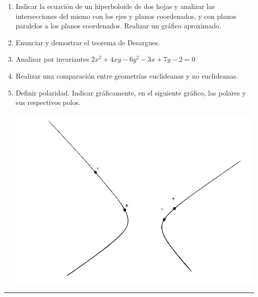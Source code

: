 \documentclass[9pt,a4paper]{extarticle}
\begin{document}
\begin{enumerate}

\item Indicar la ecuación de un hiperboloide de dos hojas y analizar las intersecciones del mismo con los ejes y planos coordenados, y con planos paralelos a los planos coordenados. Realizar un gráfico aproximado.

\item Enunciar y demostrar el teorema de Desargues.

\item Analizar por invariantes $2x^2 + 4xy - 6y^2-3x+7y-2=0$

\item Realizar una comparación entre geometrías euclideanas y no euclideanas.

\item Definir polaridad. Indicar gráficamente, en el siguiente gráfico, las polares y sus respectivos polos.
\begin{center}
\includegraphics[scale=0.6]{graffinal18.png}
\end{center}

\end{enumerate}
\hrule
\end{document}
